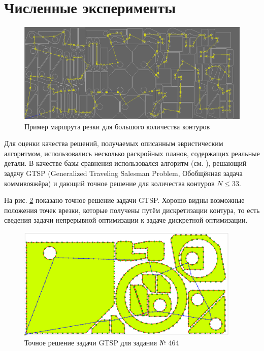 \documentclass[14pt]{extarticle}
\theoremstyle{plain}%
\theoremstyle{remark}
\begin{document}
\section{Численные эксперименты}

\begin{figure}
  \begin{center}
    \includegraphics[angle=90,height=0.8\textheight]{dip_3.png}
  \end{center}
  \caption{Пример маршрута резки для большого количества контуров}
  \label{ccp-large}
\end{figure}

Для оценки качества решений,
получаемых описанным
эвристическим алгоритмом,
использовались несколько раскройных планов,
содержащих реальные детали.
В качестве базы сравнения
использовался алгоритм
(см. \cite{bi15}),
решающий задачу GTSP
(Generalized Traveling Salesman Problem,
Обобщённая задача коммивояжёра)
и дающий точное решение для количества контуров
$N \leqslant 33$.

На рис. \ref{gtsp-path}
показано точное решение задачи GTSP.
Хорошо видны возможные положения точек врезки,
которые получены путём дискретизации контура,
то есть сведения задачи непрерывной оптимизации
к задаче дискретной оптимизации.

\begin{figure}
  \begin{center}
    \includegraphics[width=0.95\textwidth]{464-gtsp.png}
  \end{center}
  \caption{Точное решение задачи GTSP для задания № 464}
  \label{gtsp-path}
\end{figure}
\end{document}
